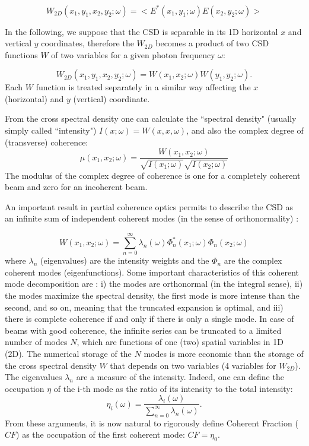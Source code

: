 \documentclass{iucr}              %
\begin{document}
\begin{equation}
W_{2D}(x_1,y_1,x_2,y_2;\omega) = <E^*(x_1,y_1;\omega) E(x_2,y_2;\omega)>
\label{eq:CSD_1D}
\end{equation}

In the following, we suppose that the CSD is separable in its 1D horizontal $x$ and vertical $y$ coordinates, therefore the $W_{2D}$ becomes a product of two CSD functions $W$ of two variables for a given photon frequency $\omega$:

\begin{equation}
W_{2D}(x_1,y_1,x_2,y_2;\omega) = W(x_1,x_2;\omega) W(y_1,y_2;\omega).
\label{eq:CSD_2D}
\end{equation}
Each $W$ function is treated separately in a similar way affecting the $x$ (horizontal) and $y$ (vertical) coordinate.

From the cross spectral density one can calculate the ``spectral density" (usually simply called ``intensity") $I(x;\omega)=W(x,x,\omega)$, and also the complex degree of (transverse) coherence: 
\begin{equation}
\mu(x_1,x_2;\omega) = \frac{W(x_1,x_2;\omega)}{\sqrt{I(x_1;\omega)}\sqrt{I(x_2;\omega)}}
\label{eq:DTC}
\end{equation}
The modulus of the complex degree of coherence is one for a completely coherent beam and zero for an incoherent beam. 

An important result in partial coherence optics permits to describe the CSD as an infinite sum of independent coherent modes (in the sense of orthonormality) :

\begin{equation}
W(x_1,x_2;\omega) = \sum_{n=0}^{\infty} \lambda_n(\omega) \Phi_n^*(x_1;\omega) \Phi_n(x_2;\omega) 
\label{eq:CMD}
\end{equation}
where $\lambda_n$ (eigenvalues) are the intensity weights and the $\Phi_n$ are the complex coherent modes (eigenfunctions). 
Some important characteristics of this coherent mode decomposition are \cite{mandel_wolf}: i) the modes are orthonormal (in the integral sense), ii) the modes maximize the spectral density, the first mode is more intense than the second, and so on, meaning that the truncated expansion is optimal, and iii) there is complete coherence if and only if there is only a single mode.
In case of beams with good coherence, the infinite series can be truncated to a limited number of modes $N$, which are functions of one (two) spatial variables in 1D (2D). The numerical storage of the $N$ modes is more economic than the storage of the cross spectral density $W$ that depends on two variables (4 variables for $W_{2D}$). 
The eigenvalues $\lambda_n$ are a measure of the intensity. Indeed, one can define the occupation $\eta$ of the i-th mode as the ratio of its intensity to the total intensity: 
\begin{equation}
\label{eq:occupation}
\eta_i(\omega) = \frac{\lambda_i(\omega)}{\sum_{n=0}^{\infty} \lambda_n(\omega)}.
\end{equation}
From these arguments, it is now natural to rigorously define Coherent Fraction ($CF$) as the occupation of the first coherent mode: $CF=\eta_0$.
\end{document}
